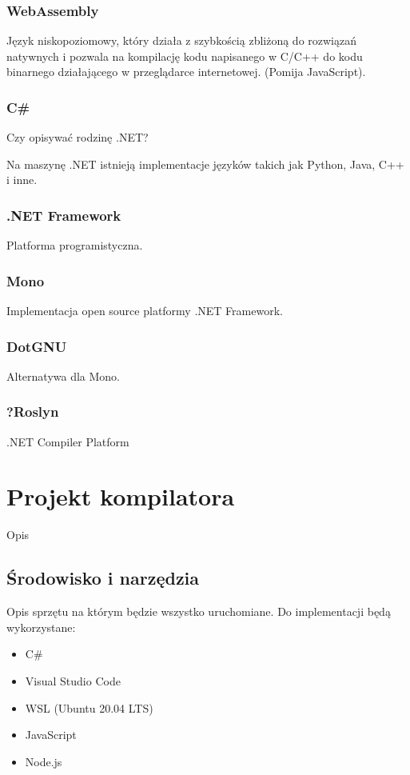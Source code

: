 \documentclass[a4paper]{article}
\begin{document}
\subsubsection{WebAssembly}
Język niskopoziomowy, który działa z szybkością zbliżoną do rozwiązań natywnych i pozwala na kompilację kodu napisanego w C/C++ do kodu binarnego działającego w przeglądarce internetowej.
(Pomija JavaScript).

\subsubsection{C\#}
Czy opisywać rodzinę .NET?

Na maszynę .NET istnieją implementacje języków takich jak Python, Java, C++ i inne.

\subsubsection{.NET Framework}
Platforma programistyczna.

\subsubsection{Mono}
Implementacja open source platformy .NET Framework.

\subsubsection{DotGNU}
Alternatywa dla Mono.

\subsubsection{?Roslyn}
.NET Compiler Platform


\section{Projekt kompilatora}
Opis 
\subsection{Środowisko i narzędzia}
Opis sprzętu na którym będzie wszystko uruchomiane.
Do implementacji będą wykorzystane:

\begin{itemize}
  \item C\#
  \item Visual Studio Code
  \item WSL (Ubuntu 20.04 LTS)
  \item JavaScript
  \item Node.js
\end{itemize}
\end{document}

